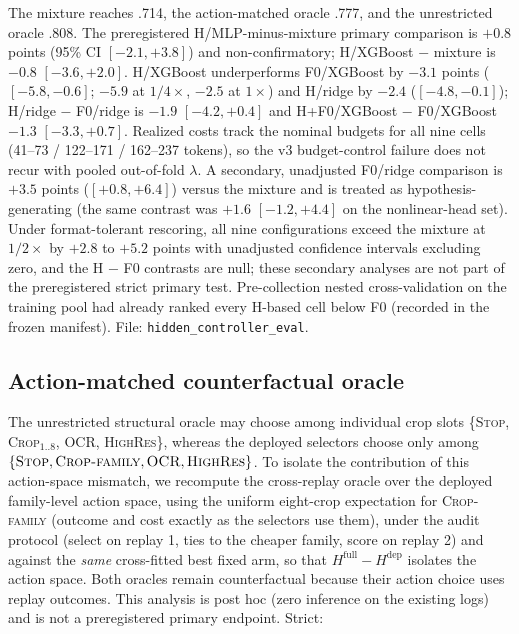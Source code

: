 \documentclass[10pt]{article}
\begin{document}
The mixture reaches .714, the action-matched oracle .777, and the
unrestricted oracle .808. The preregistered H/MLP-minus-mixture primary
comparison is $+0.8$ points (95\% CI $[-2.1, +3.8]$) and non-confirmatory;
H/XGBoost $-$ mixture is $-0.8$ $[-3.6, +2.0]$. H/XGBoost underperforms
F0/XGBoost by $-3.1$ points ($[-5.8, -0.6]$; $-5.9$ at $1/4\times$, $-2.5$
at $1\times$) and H/ridge by $-2.4$ ($[-4.8, -0.1]$); H/ridge $-$ F0/ridge
is $-1.9$ $[-4.2, +0.4]$ and H+F0/XGBoost $-$ F0/XGBoost $-1.3$
$[-3.3, +0.7]$. Realized costs track the nominal budgets for all nine
cells (41--73 / 122--171 / 162--237 tokens), so the v3 budget-control
failure does not recur with pooled out-of-fold $\lambda$. A secondary,
unadjusted F0/ridge comparison is $+3.5$ points ($[+0.8, +6.4]$) versus
the mixture and is treated as hypothesis-generating (the same contrast was
$+1.6$ $[-1.2, +4.4]$ on the nonlinear-head set). Under format-tolerant
rescoring, all nine configurations exceed the mixture at $1/2\times$ by
$+2.8$ to $+5.2$ points with unadjusted confidence intervals excluding
zero, and the H $-$ F0 contrasts are null; these secondary analyses are not
part of the preregistered strict primary test. Pre-collection nested
cross-validation on the training pool had already ranked every H-based
cell below F0 (recorded in the frozen manifest). File:
\texttt{hidden\_controller\_eval}.

\subsection{Action-matched counterfactual oracle}
\label{sec:results:deporacle}

The unrestricted structural oracle may choose among individual crop slots
\{\textsc{Stop}, \textsc{Crop}$_{1..8}$, \textsc{OCR}, \textsc{HighRes}\},
whereas the deployed selectors choose only among
$\{\textsc{Stop},\textsc{Crop-family},\textsc{OCR},\textsc{HighRes}\}$. To
isolate the contribution of this action-space mismatch, we recompute the
cross-replay oracle over the deployed family-level action space, using the
uniform eight-crop expectation for \textsc{Crop-family} (outcome and cost
exactly as the selectors use them), under the audit protocol (select on
replay 1, ties to the cheaper family, score on replay 2) and against the
\emph{same} cross-fitted best fixed arm, so that $H^{\mathrm{full}} -
H^{\mathrm{dep}}$ isolates the action space. Both oracles remain
counterfactual because their action choice uses replay outcomes. This
analysis is post hoc (zero inference on the existing logs) and is not a
preregistered primary endpoint. Strict:
\end{document}
